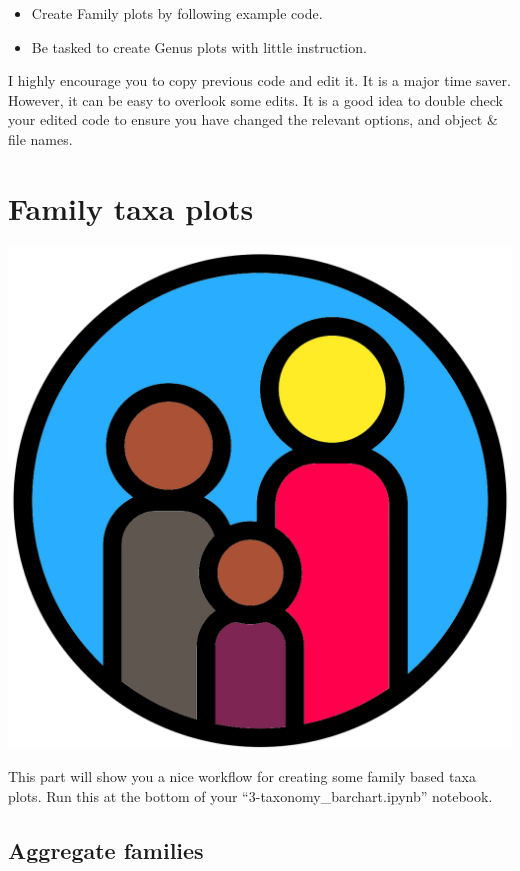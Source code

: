 \documentclass[
]{book}
\providecommand{\tightlist}{%
  \setlength{\itemsep}{0pt}\setlength{\parskip}{0pt}}
\begin{document}
\begin{itemize}
\tightlist
\item
  Create Family plots by following example code.
\item
  Be tasked to create Genus plots with little instruction.
\end{itemize}

I highly encourage you to copy previous code and edit it.
It is a major time saver.
However, it can be easy to overlook some edits.
It is a good idea to double check your edited code to ensure you have changed the relevant options, and object \& file names.

\hypertarget{family-taxa-plots}{%
\section{Family taxa plots}\label{family-taxa-plots}}

\includegraphics{figures/family.png}

This part will show you a nice workflow for creating some family based taxa plots.
Run this at the bottom of your ``3-taxonomy\_barchart.ipynb'' notebook.

\hypertarget{aggregate-families}{%
\subsection{Aggregate families}\label{aggregate-families}}
\end{document}
